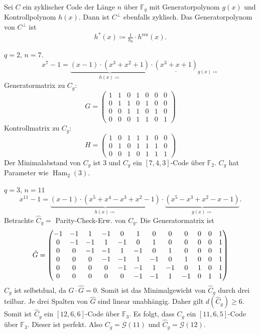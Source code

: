 \documentclass{cheat-sheet}
\newcommand{\F}{\mathbb{F}} %
\DeclareMathOperator{\Ham}{Ham} %
\newcommand{\Golay}{\mathcal{G}} %
\newcommand{\rez}{\mathrm{rez}} %
\begin{document}
\begin{satz}
  Sei $C$ ein zyklischer Code der Länge $n$ über $\F_q$ mit Generatorpolynom $g(x)$ und Kontrollpolynom $h(x)$.
  Dann ist $C^\perp$ ebenfalls zyklisch.
  Das Generatorpolynom von $C^\perp$ ist
  \[
    h^*(x) \coloneqq \tfrac{1}{h_0} \cdot h^\rez(x).
  \]
\end{satz}

\begin{bsp}
  $q=2$, $n=7$.
  \[
    x^7 - 1 = \underbrace{(x-1) \cdot (x^3 + x^2 + 1)}_{h(x) \coloneqq} \cdot \underline{(x^3 + x + 1)}_{g(x) \coloneqq}
  \]
  Generatormatrix zu $C_g$:
  \[
    G = \begin{pmatrix}
      1 & 1 & 0 & 1 & 0 & 0 & 0 \\
      0 & 1 & 1 & 0 & 1 & 0 & 0 \\
      0 & 0 & 1 & 1 & 0 & 1 & 0 \\
      0 & 0 & 0 & 1 & 1 & 0 & 1
    \end{pmatrix}
  \]
  Kontrollmatrix zu $C_g$:
  \[
    H = \begin{pmatrix}
      1 & 0 & 1 & 1 & 1 & 0 & 0 \\
      0 & 1 & 0 & 1 & 1 & 1 & 0 \\
      0 & 0 & 1 & 0 & 1 & 1 & 1
    \end{pmatrix}
  \]
  Der Minimalabstand von $C_g$ ist $3$ und $C_g$ ein $[7, 4, 3]$-Code über $\F_2$.
  $C_g$ hat Parameter wie $\Ham_2(3)$.
\end{bsp}

\begin{bsp}
  $q = 3$, $n = 11$
  \[
    x^11 - 1 = \underbrace{(x-1) \cdot (x^5 + x^4 - x^3 + x^2 - 1)}_{h(x) \coloneqq} \cdot \underbrace{(x^5 - x^3 + x^2 - x - 1)}_{g(x) \coloneqq}.
  \]
  Betrachte $\hat{C}_g = $ Parity-Check-Erw. von $C_g$.
  Die Generatormatrix ist
  \[
    \setcounter{MaxMatrixCols}{20} %
    \hat{G} = \begin{pmatrix}
      -1 & -1 & 1 & -1 & 0 & 1 & 0 & 0 & 0 & 0 & 0 & 1 \\
      0 & -1 & -1 & 1 & -1 & 0 & 1 & 0 & 0 & 0 & 0 & 1 \\
      0 & 0 & -1 & -1 & 1 & -1 & 0 & 1 & 0 & 0 & 0 & 1 \\
      0 & 0 & 0 & -1 & -1 & 1 & -1 & 0 & 1 & 0 & 0 & 1 \\
      0 & 0 & 0 & 0 & -1 & -1 & 1 & -1 & 0 & 1 & 0 & 1 \\
      0 & 0 & 0 & 0 & 0 & -1 & -1 & 1 & -1 & 0 & 1 & 1
    \end{pmatrix}
  \]
  $\hat{C}_g$ ist selbstdual, da $\hat{G} \cdot \hat{G} = 0$.
  Somit ist das Minimalgewicht von $\hat{C}_g$ durch drei teilbar.
  Je drei Spalten von $\hat{G}$ sind linear unabhängig.
  Daher gilt $d(\hat{C}_g) \geq 6$.
  Somit ist $\hat{C}_g$ ein $[12, 6, 6]$-Code über $\F_3$.
  Es folgt, dass $C_g$ ein $[11, 6, 5]$-Code über $\F_3$.
  Dieser ist perfekt.
  Also $C_g = \Golay(11)$ und $\hat{C}_g = \Golay(12)$.
\end{bsp}
\end{document}
